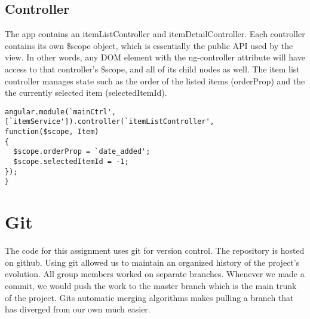 \documentclass[letterpaper, 12pt]{article}
\begin{document}
\subsection{Controller}
\noindent The app contains an itemListController and itemDetailController.  Each controller contains its own \$scope object, which is essentially the public API used by the view. In other words, any DOM element with the ng-controller attribute will have access to that controller's \$scope, and all of its child nodes as well. The item list controller manages state such as the order of the listed items (orderProp) and the the currently selected item (selectedItemId).

\vspace{2mm}
\vspace{-3mm}\begin{verbatim}
angular.module(`mainCtrl',
[`itemService']).controller(`itemListController',
function($scope, Item) 
{
  $scope.orderProp = `date_added';
  $scope.selectedItemId = -1;
}); 
}
\end{verbatim}

\section{Git}
The code for this assignment uses git for version control. The repository is
hosted on github.  Using git allowed us to maintain an organized history of the project's evolution.  All group members worked on separate branches. Whenever we made a commit, we would push the work to the master branch which is the main trunk of the project. Gits automatic merging algorithms makes pulling a branch that has diverged from our own much easier.
\end{document}
